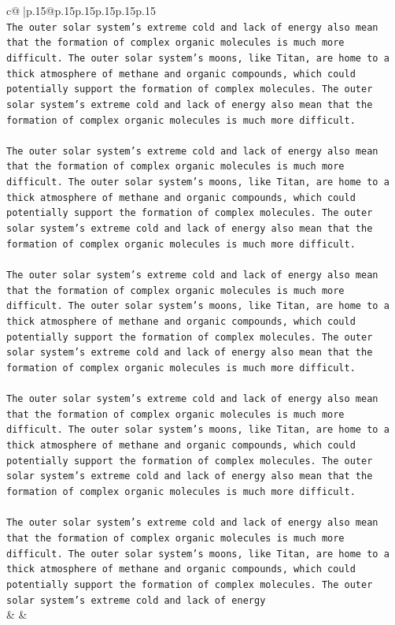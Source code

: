 \documentclass{article}
\begin{document}
{\begin{supertabular}{c@{$\;$}|p{.15\linewidth}@{}p{.15\linewidth}p{.15\linewidth}p{.15\linewidth}p{.15\linewidth}p{.15\linewidth}}
{{{\\ 
\texttt{The outer solar system's extreme cold and lack of energy also mean that the formation of complex organic molecules is much more difficult. The outer solar system's moons, like Titan, are home to a thick atmosphere of methane and organic compounds, which could potentially support the formation of complex molecules. The outer solar system's extreme cold and lack of energy also mean that the formation of complex organic molecules is much more difficult.} \\
\\ 
\texttt{The outer solar system's extreme cold and lack of energy also mean that the formation of complex organic molecules is much more difficult. The outer solar system's moons, like Titan, are home to a thick atmosphere of methane and organic compounds, which could potentially support the formation of complex molecules. The outer solar system's extreme cold and lack of energy also mean that the formation of complex organic molecules is much more difficult.} \\
\\ 
\texttt{The outer solar system's extreme cold and lack of energy also mean that the formation of complex organic molecules is much more difficult. The outer solar system's moons, like Titan, are home to a thick atmosphere of methane and organic compounds, which could potentially support the formation of complex molecules. The outer solar system's extreme cold and lack of energy also mean that the formation of complex organic molecules is much more difficult.} \\
\\ 
\texttt{The outer solar system's extreme cold and lack of energy also mean that the formation of complex organic molecules is much more difficult. The outer solar system's moons, like Titan, are home to a thick atmosphere of methane and organic compounds, which could potentially support the formation of complex molecules. The outer solar system's extreme cold and lack of energy also mean that the formation of complex organic molecules is much more difficult.} \\
\\ 
\texttt{The outer solar system's extreme cold and lack of energy also mean that the formation of complex organic molecules is much more difficult. The outer solar system's moons, like Titan, are home to a thick atmosphere of methane and organic compounds, which could potentially support the formation of complex molecules. The outer solar system's extreme cold and lack of energy} \\
            }
        }
    }
    & & \\ \\


\end{supertabular}}
\end{document}
